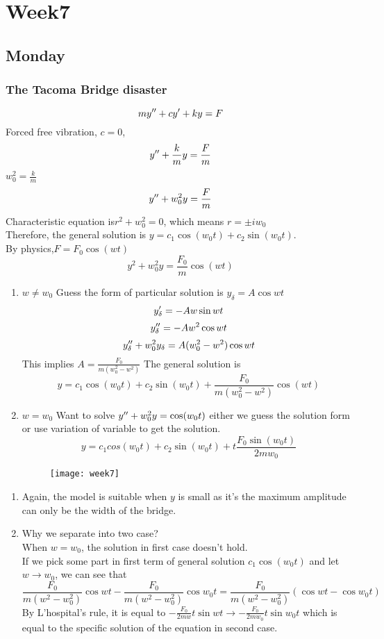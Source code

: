\chapter{Week7}

\section{Monday}
\subsection{The Tacoma Bridge disaster}
\[my^{\prime\prime}+cy^{\prime}+ky=F
\]
Forced free vibration, $c=0$,
\[y^{\prime\prime}+\frac{k}{m}y=\frac{F}{m}
\]
$w_0^2=\frac{k}{m}$
\[y^{\prime\prime}+w_0^2y=\frac{F}{m}
\]
Characteristic equation is$  r^2+w_0^2=0$, which means $r=\pm iw_0$\\
Therefore, the general solution is $y=c_1\cos(w_0t)+c_2\sin(w_0t)$.\\ By physics,$F=F_0\cos(wt)$
\[y^2+w_0^2y=\frac{F_0}{m}\cos(wt)
\]
\begin{enumerate}
\item $w\neq w_0$
Guess the form of particular solution is $y_\delta=A\cos wt$
\[y_\delta^{\prime}=-Aw\sin wt
\]
\[y_\delta^{\prime\prime}=-Aw^2\cos wt
\]
\[y_\delta^{\prime\prime}+w_0^2y_\delta=A(w_0^2-w^2)\cos wt
\]
This implies $A=\frac{F_0}{m(w_0^2-w^2)}$
The general solution is 
\[y=c_1\cos(w_0t)+c_2\sin(w_0t)+\frac{F_0}{m(w_0^2-w^2)}\cos(wt)
\]

\item $w=w_0$
Want to solve $y^{\prime\prime}+w_0^2y=\cos(w_0t)$ either we guess the solution form or use variation of variable to get the solution.
\[y=c_1cos(w_0t)+c_2\sin(w_0t)+t\frac{F_0\sin(w_0t)}{2mw_0}
\]
\begin{figure}[H]
\centering
\texttt{[image: week7]}
\end{figure}


\end{enumerate}
\begin{remark}
\begin{enumerate}
\item
Again, the model is suitable when $y$ is small as it's the maximum amplitude can only be the width of the bridge.
\item Why we separate into two case?\\
When $w=w_0$, the solution in first case doesn't hold.\\If we pick some part in first term of general solution $c_1\cos(w_0t)$ and let $w\rightarrow w_0$, we can see that
\[\frac{F_0}{m(w^2-w_0^2)}\cos wt-\frac{F_0}{m(w^2-w_0^2)}\cos w_0t=\frac{F_0}{m(w^2-w_0^2)}(\cos wt-\cos w_0t)
\]
By L'hospital's rule, it is equal to $-\frac{F_0}{2mw}t\sin wt\rightarrow -\frac{F_0}{2mw_0}t\sin w_0t$ which is equal to the specific solution of the equation in second case.
\end{enumerate}
\end{remark}
